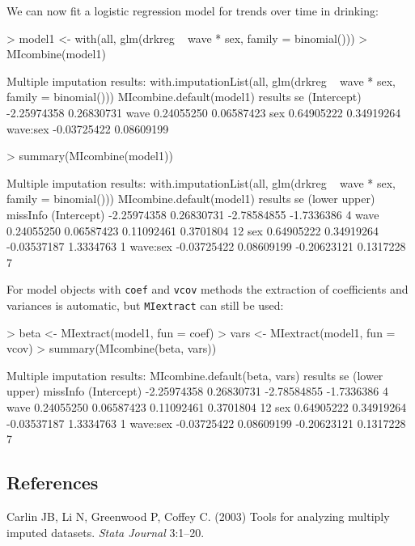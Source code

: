 \documentclass[12pt]{article}
\begin{document}
We can now fit a logistic regression model for trends over time in drinking:
\begin{Schunk}
\begin{Sinput}
> model1 <- with(all, glm(drkreg ~ wave * sex, family = binomial()))
> MIcombine(model1)
\end{Sinput}
\begin{Soutput}
Multiple imputation results:
      with.imputationList(all, glm(drkreg ~ wave * sex, family = binomial()))
      MIcombine.default(model1)
                results         se
(Intercept) -2.25974358 0.26830731
wave         0.24055250 0.06587423
sex          0.64905222 0.34919264
wave:sex    -0.03725422 0.08609199
\end{Soutput}
\begin{Sinput}
> summary(MIcombine(model1))
\end{Sinput}
\begin{Soutput}
Multiple imputation results:
      with.imputationList(all, glm(drkreg ~ wave * sex, family = binomial()))
      MIcombine.default(model1)
                results         se      (lower     upper) missInfo
(Intercept) -2.25974358 0.26830731 -2.78584855 -1.7336386      4 %
wave         0.24055250 0.06587423  0.11092461  0.3701804     12 %
sex          0.64905222 0.34919264 -0.03537187  1.3334763      1 %
wave:sex    -0.03725422 0.08609199 -0.20623121  0.1317228      7 %
\end{Soutput}
\end{Schunk}

For model objects with \texttt{coef} and \texttt{vcov} methods the
extraction of coefficients and variances is automatic, but \texttt{MIextract} can still be used:
\begin{Schunk}
\begin{Sinput}
> beta <- MIextract(model1, fun = coef)
> vars <- MIextract(model1, fun = vcov)
> summary(MIcombine(beta, vars))
\end{Sinput}
\begin{Soutput}
Multiple imputation results:
      MIcombine.default(beta, vars)
                results         se      (lower     upper) missInfo
(Intercept) -2.25974358 0.26830731 -2.78584855 -1.7336386      4 %
wave         0.24055250 0.06587423  0.11092461  0.3701804     12 %
sex          0.64905222 0.34919264 -0.03537187  1.3334763      1 %
wave:sex    -0.03725422 0.08609199 -0.20623121  0.1317228      7 %
\end{Soutput}
\end{Schunk}


\subsection*{References}

Carlin JB, Li N, Greenwood P, Coffey C. (2003) Tools for analyzing multiply imputed datasets. \emph{Stata Journal} 3:1--20.
\end{document}
